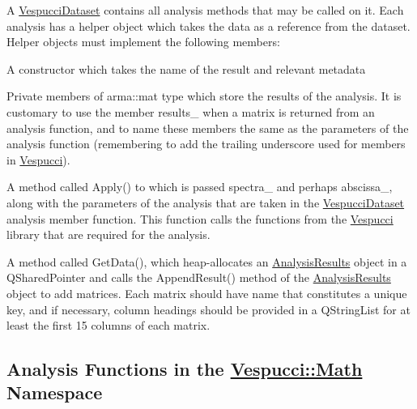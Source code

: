 A {\ttfamily \hyperlink{class_vespucci_dataset}{Vespucci\+Dataset}} contains all analysis methods that may be called on it. Each analysis has a helper object which takes the data as a reference from the dataset. Helper objects must implement the following members\+:
\begin{DoxyItemize}
\item A constructor which takes the name of the result and relevant metadata
\item Private members of {\ttfamily arma\+::mat} type which store the results of the analysis. It is customary to use the member {\ttfamily results\+\_\+} when a matrix is returned from an analysis function, and to name these members the same as the parameters of the analysis function (remembering to add the trailing underscore used for members in \hyperlink{namespace_vespucci}{Vespucci}).
\item A method called {\ttfamily Apply()} to which is passed {\ttfamily spectra\+\_\+} and perhaps {\ttfamily abscissa\+\_\+}, along with the parameters of the analysis that are taken in the {\ttfamily \hyperlink{class_vespucci_dataset}{Vespucci\+Dataset}} analysis member function. This function calls the functions from the \hyperlink{namespace_vespucci}{Vespucci} library that are required for the analysis.
\item A method called {\ttfamily Get\+Data()}, which heap-\/allocates an {\ttfamily \hyperlink{class_analysis_results}{Analysis\+Results}} object in a {\ttfamily Q\+Shared\+Pointer} and calls the {\ttfamily Append\+Result()} method of the {\ttfamily \hyperlink{class_analysis_results}{Analysis\+Results}} object to add matrices. Each matrix should have name that constitutes a unique key, and if necessary, column headings should be provided in a {\ttfamily Q\+String\+List} for at least the first 15 columns of each matrix.
\end{DoxyItemize}

\subsection*{Analysis Functions in the {\ttfamily \hyperlink{namespace_vespucci_1_1_math}{Vespucci\+::\+Math}} Namespace }

